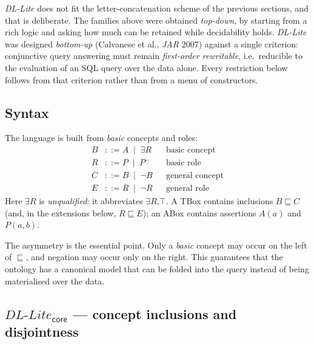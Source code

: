\documentclass[11pt,a4paper]{article}
\newcommand{\dllite}[1]{\ensuremath{\textit{DL-Lite}_{#1}}}
\newcommand{\dlliteplain}{\textit{DL-Lite}}
\newcommand{\sub}{\sqsubseteq}
\newcommand{\inv}[1]{#1^{-}}
\begin{document}
\dlliteplain{} does not fit the letter-concatenation scheme of the previous
sections, and that is deliberate. The families above were obtained
\emph{top-down}, by starting from a rich logic and asking how much can be
retained while decidability holds. \dlliteplain{} was designed \emph{bottom-up}
(Calvanese et al., \emph{JAR} 2007) against a single criterion: conjunctive
query answering must remain \emph{first-order rewritable}, i.e.\ reducible to
the evaluation of an SQL query over the data alone. Every restriction below
follows from that criterion rather than from a menu of constructors.

\subsection*{Syntax}

The language is built from \emph{basic} concepts and roles:
\begin{align*}
  B &::= A \;\mid\; \exists R          &&\text{basic concept}\\
  R &::= P \;\mid\; \inv{P}            &&\text{basic role}\\
  C &::= B \;\mid\; \neg B             &&\text{general concept}\\
  E &::= R \;\mid\; \neg R             &&\text{general role}
\end{align*}
Here $\exists R$ is \emph{unqualified}: it abbreviates $\exists R.\top$.
A TBox contains inclusions $B \sub C$ (and, in the extensions below,
$R \sub E$); an ABox contains assertions $A(a)$ and $P(a,b)$.

The asymmetry is the essential point. Only a \emph{basic} concept may occur on
the left of $\sub$, and negation may occur only on the right. This guarantees
that the ontology has a canonical model that can be folded into the query
instead of being materialised over the data.

\subsection*{$\dllite{\mathsf{core}}$ --- concept inclusions and disjointness}
\end{document}
